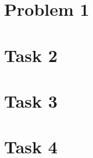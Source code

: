 \documentclass{article}
\numberwithin{equation}{section} %
\numberwithin{figure}{section} %
\begin{document}

\section*{Problem 1}  %
\newpage \section*{Task 2}  %
\newpage \section*{Task 3}  %
\newpage \section*{Task 4}  %
\end{document}
